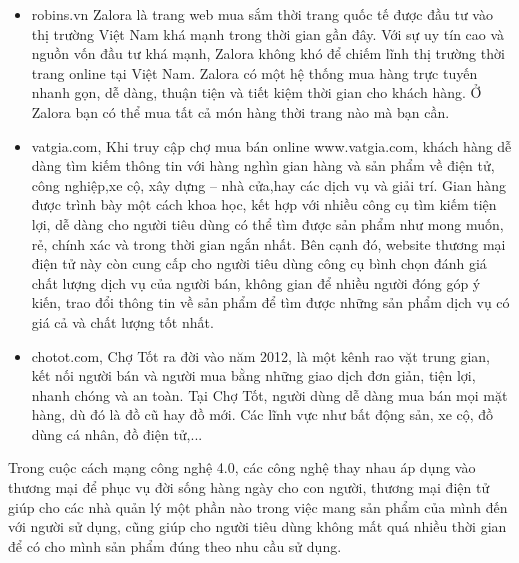 \begin{itemize}
\item robins.vn Zalora là trang web mua sắm thời trang quốc tế được đầu tư vào thị trường Việt Nam khá mạnh trong thời gian gần đây. Với sự uy tín cao và nguồn vốn đầu tư khá mạnh, Zalora không khó để chiếm lĩnh thị trường thời trang online tại Việt Nam. Zalora có một hệ thống mua hàng trực tuyến nhanh gọn, dễ dàng, thuận tiện và tiết kiệm thời gian cho khách hàng. Ở Zalora bạn có thể mua tất cả món hàng thời trang nào mà bạn cần.
\item vatgia.com, Khi truy cập chợ mua bán online www.vatgia.com, khách hàng dễ dàng tìm kiếm thông tin với hàng nghìn gian hàng và sản phẩm về điện tử, công nghiệp,xe cộ, xây dựng – nhà cửa,hay các dịch vụ và giải trí. Gian hàng được trình bày một cách khoa học, kết hợp với nhiều công cụ tìm kiếm tiện lợi, dễ dàng cho người tiêu dùng có thể tìm được sản phẩm như mong muốn, rẻ, chính xác và trong thời gian ngắn nhất. Bên cạnh đó, website thương mại điện tử này còn cung cấp cho người tiêu dùng công cụ bình chọn đánh giá chất lượng dịch vụ của người bán, không gian để nhiều người đóng góp ý kiến, trao đổi thông tin về sản phẩm để tìm được những sản phẩm dịch vụ có giá cả và chất lượng tốt nhất.
\item chotot.com, Chợ Tốt ra đời vào năm 2012, là một kênh rao vặt trung gian, kết nối người bán và người mua bằng những giao dịch đơn giản, tiện lợi, nhanh chóng và an toàn. Tại Chợ Tốt, người dùng dễ dàng mua bán mọi mặt hàng, dù đó là đồ cũ hay đồ mới. Các lĩnh vực như bất động sản, xe cộ, đồ dùng cá nhân, đồ điện tử,...\cite{1}
\end{itemize}
\par
Trong cuộc cách mạng công nghệ 4.0, các công nghệ thay nhau áp dụng vào thương mại để phục vụ đời sống hàng ngày cho con người, thương mại điện tử giúp cho các nhà quản lý một phần nào trong việc mang sản phẩm của mình đến với người sử dụng, cũng giúp cho người tiêu dùng không mất quá nhiều thời gian để có cho mình sản phẩm đúng theo nhu cầu sử dụng.
